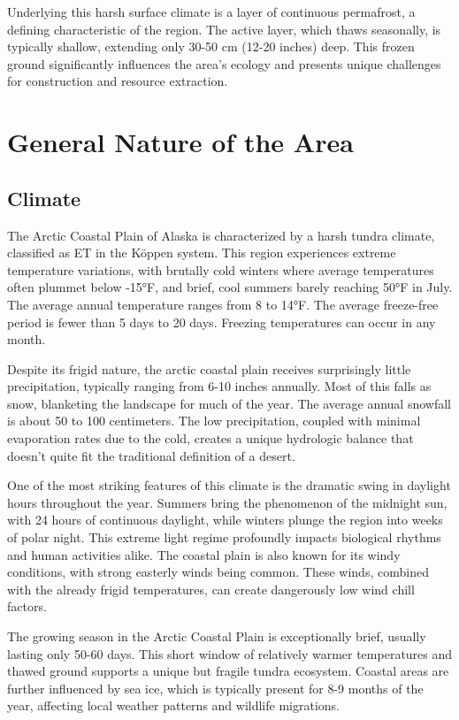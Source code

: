 \documentclass[
]{book}
\theoremstyle{definition}
\theoremstyle{definition}
\theoremstyle{definition}
\theoremstyle{definition}
\theoremstyle{remark}
\begin{document}
Underlying this harsh surface climate is a layer of continuous permafrost, a defining characteristic of the region. The active layer, which thaws seasonally, is typically shallow, extending only 30-50 cm (12-20 inches) deep. This frozen ground significantly influences the area's ecology and presents unique challenges for construction and resource extraction.

\hypertarget{general-nature-of-the-area-1}{%
\chapter{General Nature of the Area}\label{general-nature-of-the-area-1}}

\hypertarget{climate-1}{%
\section{Climate}\label{climate-1}}

The Arctic Coastal Plain of Alaska is characterized by a harsh tundra climate, classified as ET in the Köppen system. This region experiences extreme temperature variations, with brutally cold winters where average temperatures often plummet below -15°F, and brief, cool summers barely reaching 50°F in July. The average annual temperature ranges from 8 to 14°F. The average freeze-free period is fewer than 5 days to 20 days. Freezing temperatures can occur in any month.

Despite its frigid nature, the arctic coastal plain receives surprisingly little precipitation, typically ranging from 6-10 inches annually. Most of this falls as snow, blanketing the landscape for much of the year. The average annual snowfall is about 50 to 100 centimeters. The low precipitation, coupled with minimal evaporation rates due to the cold, creates a unique hydrologic balance that doesn't quite fit the traditional definition of a desert.

One of the most striking features of this climate is the dramatic swing in daylight hours throughout the year. Summers bring the phenomenon of the midnight sun, with 24 hours of continuous daylight, while winters plunge the region into weeks of polar night. This extreme light regime profoundly impacts biological rhythms and human activities alike. The coastal plain is also known for its windy conditions, with strong easterly winds being common. These winds, combined with the already frigid temperatures, can create dangerously low wind chill factors.

The growing season in the Arctic Coastal Plain is exceptionally brief, usually lasting only 50-60 days. This short window of relatively warmer temperatures and thawed ground supports a unique but fragile tundra ecosystem. Coastal areas are further influenced by sea ice, which is typically present for 8-9 months of the year, affecting local weather patterns and wildlife migrations.
\end{document}
